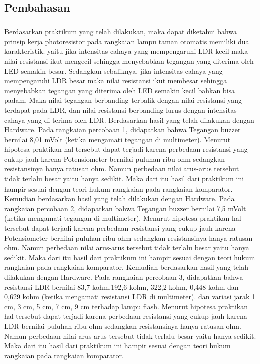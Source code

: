 \documentclass[12pt,a4paper]{article}
\begin{document}
\subsection{Pembahasan}
\subparagraph{ }
	Berdasarkan praktikum yang telah dilakukan, maka dapat diketahui bahwa prinsip kerja photoresistor pada rangkaian lampu taman otomatis memiliki dua karakteristik. yaitu jika intensitas cahaya yang mempengaruhi LDR kecil maka nilai resistansi ikut mengecil sehingga menyebabkan tegangan yang diterima oleh LED semakin besar. Sedangkan sebaliknya, jika intensitas cahaya yang mempengaruhi LDR besar maka nilai resistansi ikut membesar sehingga menyebabkan tegangan yang diterima oleh LED semakin kecil bahkan bisa padam. Maka nilai tegangan berbanding terbalik dengan nilai resistansi yang terdapat pada LDR, dan nilai resistansi berbanding lurus dengan intensitas cahaya yang di terima oleh LDR.
	Berdasarkan hasil yang telah dilakukan dengan Hardware. Pada rangkaian percobaan 1, didapatkan bahwa Tegangan buzzer bernilai 8,01 mVolt (ketika mengamati tegangan di multimeter). Menurut hipotesa praktikan hal tersebut dapat terjadi karena perbedaan resistansi yang cukup jauh karena Potensiometer bernilai puluhan ribu ohm sedangkan resistansinya hanya ratusan ohm. Namun perbedaan nilai arus-arus tersebut tidak terlalu besar yaitu hanya sedikit. Maka dari itu hasil dari praktikum ini hampir sesuai dengan teori hukum rangkaian pada rangkaian komparator.
	Kemudian berdasarkan hasil yang telah dilakukan dengan Hardware. Pada rangkaian percobaan 2, didapatkan bahwa Tegangan buzzer bernilai 7,5 mVolt (ketika mengamati tegangan di multimeter). Menurut hipotesa praktikan hal tersebut dapat terjadi karena perbedaan resistansi yang cukup jauh karena Potensiometer bernilai puluhan ribu ohm sedangkan resistansinya hanya ratusan ohm. Namun perbedaan nilai arus-arus tersebut tidak terlalu besar yaitu hanya sedikit. Maka dari itu hasil dari praktikum ini hampir sesuai dengan teori hukum rangkaian pada rangkaian komparator.
	Kemudian berdasarkan hasil yang telah dilakukan dengan Hardware. Pada rangkaian percobaan 3, didapatkan bahwa resistansi LDR bernilai 83,7 kohm,192,6 kohm, 322,2 kohm, 0,448 kohm dan 0,629 kohm (ketika mengamati resistansi LDR di multimeter). dan variasi jarak 1 cm, 3 cm, 5 cm, 7 cm, 9 cm terhadap lampu flash. Menurut hipotesa praktikan hal tersebut dapat terjadi karena perbedaan resistansi yang cukup jauh karena LDR bernilai puluhan ribu ohm sedangkan resistansinya hanya ratusan ohm. Namun perbedaan nilai arus-arus tersebut tidak terlalu besar yaitu hanya sedikit. Maka dari itu hasil dari praktikum ini hampir sesuai dengan teori hukum rangkaian pada rangkaian komparator.
\end{document}
